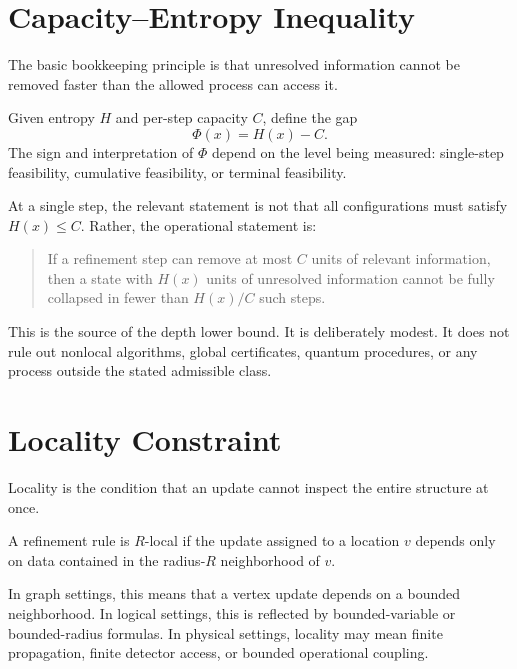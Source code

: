 \section{Capacity--Entropy Inequality}

The basic bookkeeping principle is that unresolved information cannot be
removed faster than the allowed process can access it.

\begin{definition}
Given entropy \(H\) and per-step capacity \(C\), define the gap
\[
\Phi(x)=H(x)-C.
\]
The sign and interpretation of \(\Phi\) depend on the level being measured:
single-step feasibility, cumulative feasibility, or terminal feasibility.
\end{definition}

At a single step, the relevant statement is not that all configurations must
satisfy \(H(x)\le C\). Rather, the operational statement is:

\begin{quote}
If a refinement step can remove at most \(C\) units of relevant information,
then a state with \(H(x)\) units of unresolved information cannot be fully
collapsed in fewer than \(H(x)/C\) such steps.
\end{quote}

This is the source of the depth lower bound. It is deliberately modest. It
does not rule out nonlocal algorithms, global certificates, quantum procedures,
or any process outside the stated admissible class.

\section{Locality Constraint}

Locality is the condition that an update cannot inspect the entire structure
at once.

\begin{definition}
A refinement rule is \(R\)-local if the update assigned to a location \(v\)
depends only on data contained in the radius-\(R\) neighborhood of \(v\).
\end{definition}

In graph settings, this means that a vertex update depends on a bounded
neighborhood. In logical settings, this is reflected by bounded-variable or
bounded-radius formulas. In physical settings, locality may mean finite
propagation, finite detector access, or bounded operational coupling.

